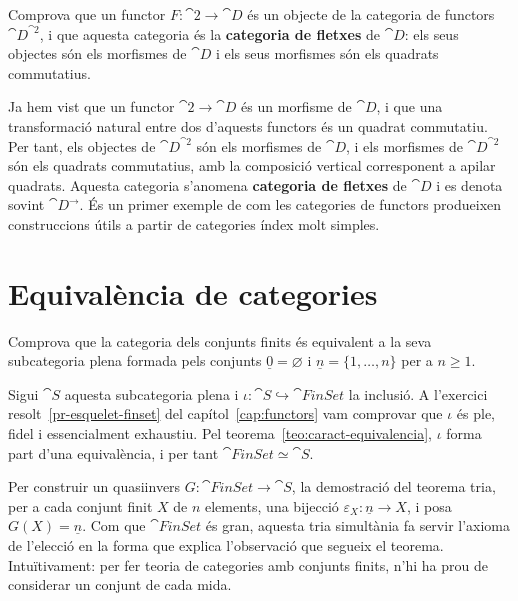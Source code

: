 \begin{exercici}
Comprova que un functor $F\colon\cat{2}\to\cat{D}$ és un objecte de la categoria de functors $\cat{D}^{\cat{2}}$, i que aquesta categoria és la \textbf{categoria de fletxes} de $\cat{D}$: els seus objectes són els morfismes de $\cat{D}$ i els seus morfismes són els quadrats commutatius.
\end{exercici}

\begin{solucio}
Ja hem vist que un functor $\cat{2}\to\cat{D}$ és un morfisme de $\cat{D}$, i que una transformació natural entre dos d'aquests functors és un quadrat commutatiu. Per tant, els objectes de $\cat{D}^{\cat{2}}$ són els morfismes de $\cat{D}$, i els morfismes de $\cat{D}^{\cat{2}}$ són els quadrats commutatius, amb la composició vertical corresponent a apilar quadrats. Aquesta categoria s'anomena \textbf{categoria de fletxes} de $\cat{D}$ i es denota sovint $\cat{D}^{\to}$. És un primer exemple de com les categories de functors produeixen construccions útils a partir de categories índex molt simples.
\end{solucio}

\section{Equivalència de categories}

\begin{exercici}
Comprova que la categoria dels conjunts finits és equivalent a la seva subcategoria plena formada pels conjunts $\underline{0}=\varnothing$ i $\underline{n}=\{1,\dots,n\}$ per a $n\geq 1$.
\end{exercici}

\begin{solucio}
Sigui $\cat{S}$ aquesta subcategoria plena i $\iota\colon\cat{S}\hookrightarrow\cat{FinSet}$ la inclusió. A l'exercici resolt~\ref{pr-esquelet-finset} del capítol~\ref{cap:functors} vam comprovar que $\iota$ és ple, fidel i essencialment exhaustiu. Pel teorema~\ref{teo:caract-equivalencia}, $\iota$ forma part d'una equivalència, i per tant $\cat{FinSet}\simeq\cat{S}$.

Per construir un quasiinvers $G\colon\cat{FinSet}\to\cat{S}$, la demostració del teorema tria, per a cada conjunt finit $X$ de $n$ elements, una bijecció $\varepsilon_X\colon\underline{n}\to X$, i posa $G(X)=\underline{n}$. Com que $\cat{FinSet}$ és gran, aquesta tria simultània fa servir l'axioma de l'elecció en la forma que explica l'observació que segueix el teorema. Intuïtivament: per fer teoria de categories amb conjunts finits, n'hi ha prou de considerar un conjunt de cada mida.
\end{solucio}

